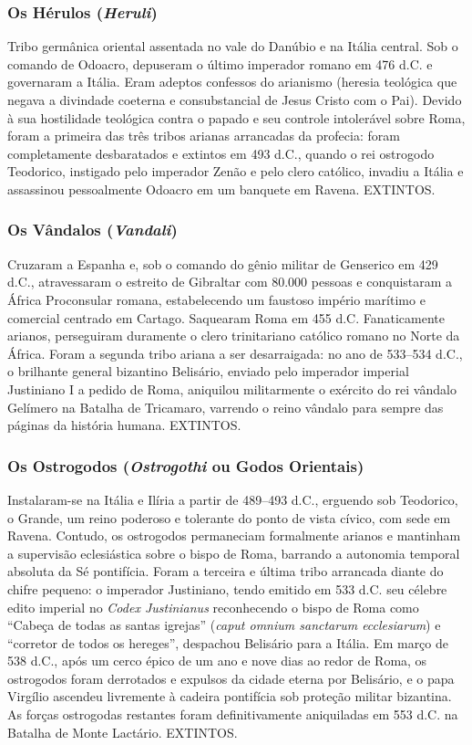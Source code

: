 \subsubsection*{Os Hérulos (\textit{Heruli})}
Tribo germânica oriental assentada no vale do Danúbio e na Itália central. Sob o comando de Odoacro, depuseram o último imperador romano em 476 d.C. e governaram a Itália. Eram adeptos confessos do arianismo (heresia teológica que negava a divindade coeterna e consubstancial de Jesus Cristo com o Pai). Devido à sua hostilidade teológica contra o papado e seu controle intolerável sobre Roma, foram a primeira das três tribos arianas arrancadas da profecia: foram completamente desbaratados e extintos em 493 d.C., quando o rei ostrogodo Teodorico, instigado pelo imperador Zenão e pelo clero católico, invadiu a Itália e assassinou pessoalmente Odoacro em um banquete em Ravena. EXTINTOS.


\subsubsection*{Os Vândalos (\textit{Vandali})}
Cruzaram a Espanha e, sob o comando do gênio militar de Genserico em 429 d.C., atravessaram o estreito de Gibraltar com 80.000 pessoas e conquistaram a África Proconsular romana, estabelecendo um faustoso império marítimo e comercial centrado em Cartago. Saquearam Roma em 455 d.C. Fanaticamente arianos, perseguiram duramente o clero trinitariano católico romano no Norte da África. Foram a segunda tribo ariana a ser desarraigada: no ano de 533–534 d.C., o brilhante general bizantino Belisário, enviado pelo imperador imperial Justiniano I a pedido de Roma, aniquilou militarmente o exército do rei vândalo Gelímero na Batalha de Tricamaro, varrendo o reino vândalo para sempre das páginas da história humana. EXTINTOS.


\subsubsection*{Os Ostrogodos (\textit{Ostrogothi} ou Godos Orientais)}
Instalaram-se na Itália e Ilíria a partir de 489–493 d.C., erguendo sob Teodorico, o Grande, um reino poderoso e tolerante do ponto de vista cívico, com sede em Ravena. Contudo, os ostrogodos permaneciam formalmente arianos e mantinham a supervisão eclesiástica sobre o bispo de Roma, barrando a autonomia temporal absoluta da Sé pontifícia. Foram a terceira e última tribo arrancada diante do chifre pequeno: o imperador Justiniano, tendo emitido em 533 d.C. seu célebre edito imperial no \textit{Codex Justinianus} reconhecendo o bispo de Roma como ``Cabeça de todas as santas igrejas'' (\textit{caput omnium sanctarum ecclesiarum}) e ``corretor de todos os hereges'', despachou Belisário para a Itália. Em março de 538 d.C., após um cerco épico de um ano e nove dias ao redor de Roma, os ostrogodos foram derrotados e expulsos da cidade eterna por Belisário, e o papa Virgílio ascendeu livremente à cadeira pontifícia sob proteção militar bizantina. As forças ostrogodas restantes foram definitivamente aniquiladas em 553 d.C. na Batalha de Monte Lactário. EXTINTOS.

